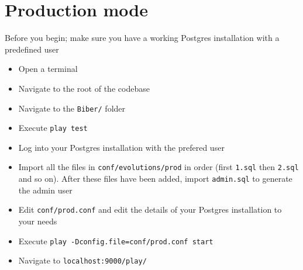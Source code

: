 \documentclass[11pt,a4paper]{article}
\begin{document}
\section{Production mode}
Before you begin; make sure you have a working Postgres installation with a predefined user

\begin{itemize}
\item Open a terminal
\item Navigate to the root of the codebase
\item Navigate to the \texttt{Biber/} folder
\item Execute \texttt{play test}
\item Log into your Postgres installation with the prefered user
\item Import all the files in \texttt{conf/evolutions/prod} in order (first \texttt{1.sql} then \texttt{2.sql} and so on). After these files have been added, import \texttt{admin.sql} to generate the admin user
\item Edit \texttt{conf/prod.conf} and edit the details of your Postgres installation to your needs
\item Execute \texttt{play -Dconfig.file=conf/prod.conf start}
\item Navigate to \texttt{localhost:9000/play/}
\end{itemize}
\end{document}
